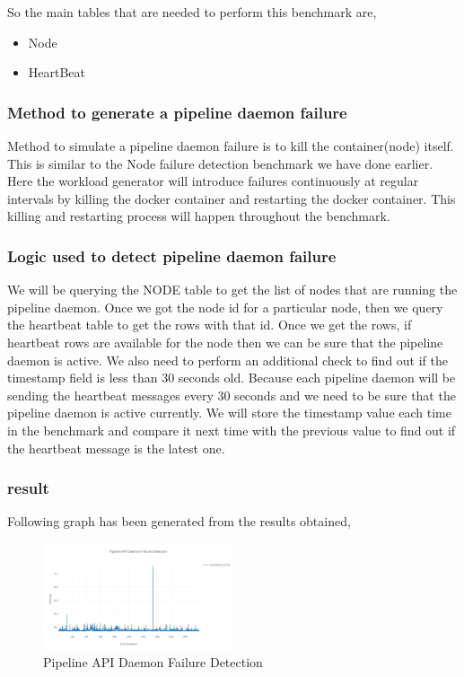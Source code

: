 So the main tables that are needed to perform this benchmark are,
    \begin{itemize}
        \item Node
        \item HeartBeat
    \end{itemize}

\subsubsection{Method to generate a pipeline daemon failure}

Method to simulate a pipeline daemon failure is to kill the container(node) itself. This is similar to the Node failure detection benchmark we have done earlier. Here the workload generator will introduce failures continuously at regular intervals by killing the docker container and restarting the docker container. This killing and restarting process will happen throughout the benchmark.

\subsubsection{Logic used to detect pipeline daemon failure}

We will be querying the NODE table to get the list of nodes that are running the pipeline daemon. Once we got the node id for a particular node, then we query the heartbeat table to get the rows with that id. 
Once we get the rows, if heartbeat rows are available for the node then we can be sure that the pipeline daemon is active. We also need to perform an additional check to find out if the timestamp field is less than 30 seconds old. Because each pipeline daemon will be sending the heartbeat messages every 30 seconds and we need to be sure that the pipeline daemon is active currently. We will store the timestamp value each time in the benchmark and compare it next time with the previous value to find out if the heartbeat message is the latest one.

\subsubsection{result}

Following graph has been generated from the results obtained,

\begin{figure}[H]
	\center
	\includegraphics[width=0.5\textwidth]{figures/benchmark_pipeline.png}
	\caption{Pipeline API Daemon Failure Detection}
	\label{fig:benchmark_pipeline}
\end{figure}

